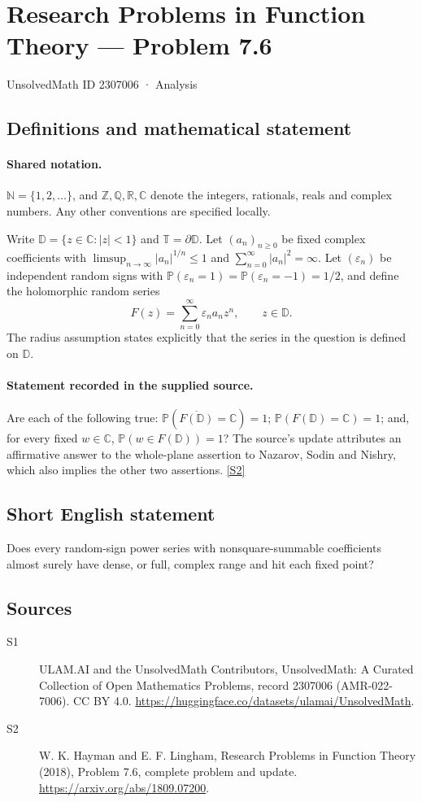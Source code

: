 \documentclass[11pt]{article}
\newcommand{\sref}[2]{\hyperlink{source:#1:#2}{[S#2]}}
\begin{document}
\setcounter{section}{2307005}
\section{Research Problems in Function Theory — Problem 7.6}\label{2307006}
{\small\sffamily UnsolvedMath ID 2307006 · Analysis}
\subsection{Definitions and mathematical statement}

\paragraph{Shared notation.}$\mathbb N=\{1,2,\ldots\}$, and $\mathbb Z,\mathbb Q,\mathbb R,\mathbb C$ denote the integers, rationals, reals and complex numbers. Any other conventions are specified locally.


Write $\mathbb D=\{z\in\mathbb C:|z|<1\}$ and $\mathbb T=\partial\mathbb D$. Let $(a_n)_{n\geq0}$ be fixed complex coefficients with $\limsup_{n\to\infty}|a_n|^{1/n}\leq1$ and $\sum_{n=0}^{\infty}|a_n|^2=\infty$. Let $(\varepsilon_n)$ be independent random signs with $\mathbb P(\varepsilon_n=1)=\mathbb P(\varepsilon_n=-1)=1/2$, and define the holomorphic random series
\[F(z)=\sum_{n=0}^{\infty}\varepsilon_na_nz^n,\qquad z\in\mathbb D.\]
The radius assumption states explicitly that the series in the question is defined on $\mathbb D$.
\paragraph{Statement recorded in the supplied source.}
Are each of the following true: $\mathbb P(\overline{F(\mathbb D)}=\mathbb C)=1$; $\mathbb P(F(\mathbb D)=\mathbb C)=1$; and, for every fixed $w\in\mathbb C$, $\mathbb P(w\in F(\mathbb D))=1$? The source's update attributes an affirmative answer to the whole-plane assertion to Nazarov, Sodin and Nishry, which also implies the other two assertions. \sref{2307006}{2}
\subsection{Short English statement}
Does every random-sign power series with nonsquare-summable coefficients almost surely have dense, or full, complex range and hit each fixed point?
\subsection{Sources}
\begin{description}
\item[\hypertarget{source:2307006:1}{S1}] ULAM.AI and the UnsolvedMath Contributors, UnsolvedMath: A Curated Collection of Open Mathematics Problems, record 2307006 (AMR-022-7006). CC BY 4.0. \url{https://huggingface.co/datasets/ulamai/UnsolvedMath}.
\item[\hypertarget{source:2307006:2}{S2}] W. K. Hayman and E. F. Lingham, Research Problems in Function Theory (2018), Problem 7.6, complete problem and update. \url{https://arxiv.org/abs/1809.07200}.
\end{description}
\label{end:2307006}
\end{document}
